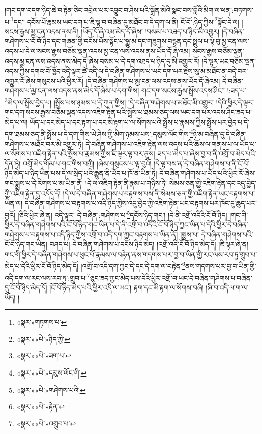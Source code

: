 །གང་དག་བདག་ཉིད་ཆེ་བ་རྟེན་ཅིང་འབྲེལ་པར་འབྱུང་བ་ཤེས་པའི་སྒྲོན་མེའི་སྣང་བས་བློའི་མིག་ལ་ཕན་:བཏགས་པ་\footnote{«སྣར་»གཏགས་པ་}དང་། དངོས་པོ་རྣམས་ཡང་དག་པ་ཇི་ལྟ་བ་བཞིན་དུ་མཐོང་བ་དེ་དག་ལ་ནི། ངོ་བོ་:ཉིད་ཀྱིས་\footnote{«སྣར་»«པེ་»ཉིད་ཀྱི་}སྟོང་དེ་ལ། །སངས་རྒྱས་མྱ་ངན་འདས་ནས་ནི། །ཡོད་དོ་ཞེ་འམ་མེད་དོ་ཞེས། །བསམ་པ་འཐད་པ་ཉིད་མི་འགྱུར། །དེ་བཞིན་གཤེགས་པ་ངོ་བོ་ཉིད་དང་གཞན་གྱི་དངོས་པོས་སྟོང་པ་སྒྱུ་མ་དང་གཟུགས་བརྙན་དང་སྤྲུལ་པ་ལྟ་བུ་མྱ་ངན་ལས་འདས་པ་དེ་ལ་སངས་རྒྱས་བཅོམ་ལྡན་འདས་མྱ་ངན་ལས་འདས་ནས་ཡོད་དོ་ཞེ་འམ། སངས་རྒྱས་བཅོམ་ལྡན་འདས་མྱ་ངན་ལས་འདས་ནས་མེད་དོ་ཞེས་བསམ་པ་དེ་དག་འཐད་པ་ཉིད་དུ་མི་འགྱུར་རོ། །དེ་ལྟར་ཡང་བཅོམ་ལྡན་འདས་ཀྱིས་དགའ་བོ་ཁྱོད་འདི་ལྟར་ཚེ་འདི་ལ་དེ་བཞིན་གཤེགས་པ་ཡང་དག་པར་རྗེས་སུ་མ་མཐོང་ན་བདེ་བར་འགྱུར་རོ་ཞེས་གསུངས་པའི་ཕྱིར་རོ། །དེ་བཞིན་གཤེགས་པ་མྱ་ངན་ལས་འདས་ནས་ཡོད་དོ་ཞེའམ། དེ་བཞིན་གཤེགས་པ་མྱ་ངན་ལས་འདས་ནས་མེད་དོ་ཞེས་པ་དག་གིས། གང་དག་སངས་རྒྱས་སྤྲོས་འདས་ཤིང་། །:ཟད་པ་\footnote{«སྣར་»«པེ་»ཟག་པ་}མེད་ལ་སྤྲོས་བྱེད་པ། །སྤྲོས་པས་ཉམས་པ་དེ་ཀུན་གྱིས། །དེ་བཞིན་གཤེགས་པ་མཐོང་མི་འགྱུར། །དེའི་ཕྱིར་དེ་ལྟར་གང་དག་སངས་རྒྱས་བཅོམ་ལྡན་འདས་འཇིག་རྟེན་པའི་སྤྲོས་པ་ཐམས་ཅད་ལས་ཡང་དག་པར་འདས་ཤིང་ཟད་པ་མེད་པ་ལ། ཡོད་པ་དང་མེད་པ་དང་རྟག་པ་དང་མི་རྟག་པ་ལ་སོགས་པའི་སྤྲོས་པ་རྣམས་ཀྱིས་སྤྲོས་པར་བྱེད་པ་དེ་དག་ཐམས་ཅད་ནི་སྤྲོས་པ་དེ་དག་གིས་ཡེ་ཤེས་ཀྱི་མིག་ཉམས་པས་:དམུས་ལོང་གིས་\footnote{«སྣར་»«པེ་»དམུས་ལོང་གི་}ཉི་མ་བཞིན་དུ་དེ་བཞིན་གཤེགས་པ་མཐོང་བར་མི་འགྱུར་ཏེ། དེ་བཞིན་གཤེགས་པ་འཇིག་རྟེན་ལས་འདས་པའི་ཆོས་ལ་གནས་པ་ལ་ཡོད་པ་ལ་སོགས་པ་འཇིག་རྟེན་པའི་སྤྲོས་པ་རྣམས་ཀྱིས་ཇི་ལྟར་ལྟ་བར་ནུས། ཟད་པ་མེད་པ་ཞེས་བྱ་བ་ནི་འགྲོ་བ་མེད་པའི་དོན་ཏེ། འགྲོ་མེད་གོམ་པ་གང་གིས་བཀྲི། །ཞེས་གསུངས་པ་ལྟ་བུའོ། །དེ་ལྟ་བས་ན་དེ་བཞིན་གཤེགས་པ་ནི་ངོ་བོ་ཉིད་མེད་པ་ཉིད་ཡིན་པས་དེ་ལ་སྲིད་པའི་རྒྱུན་ནི་ཡོད་པ་ཁོ་ན་ཡིན་ཏེ། དེ་བཞིན་གཤེགས་པ་ཡོད་པའི་ཕྱིར་རོ་ཞེས་གང་སྨྲས་པ་དེ་རིགས་པ་མ་ཡིན་ནོ། །དེ་ལ་འཇིག་རྟེན་ནི་རྣམ་པ་གཉིས་ཏེ། སེམས་ཅན་གྱི་འཇིག་རྟེན་དང་འདུ་བྱེད་ཀྱི་འཇིག་རྟེན་དུ་འདོད་དོ། །དེ་ལ་དེ་བཞིན་གཤེགས་པ་བརྟགས་པས་ནི་སེམས་ཅན་གྱི་འཇིག་རྟེན་ཡང་བརྟགས་པ་ཡིན་ལ། དེ་བཞིན་གཤེགས་པ་བརྟགས་པ་འདི་ཉིད་ཀྱིས་འདུ་བྱེད་ཀྱི་འཇིག་རྟེན་ཡང་བརྟགས་པར་ཁོང་དུ་ཆུད་པར་བྱའོ། །ཅིའི་ཕྱིར་ཞེ་ན། འདི་ལྟར། དེ་བཞིན་:གཤེགས་པ་\footnote{«སྣར་»«པེ་»གཤེགས་པའི་}དངོས་ཉིད་གང་། །དེ་ནི་འགྲོ་འདིའི་ངོ་བོ་ཉིད། །གང་གི་ཕྱིར་དེ་བཞིན་གཤེགས་པའི་ངོ་བོ་ཉིད་གང་ཡིན་པ་དེ་ནི་འགྲོ་བ་འདིའི་ངོ་བོ་ཉིད་ཀྱང་ཡིན་པ་དེའི་ཕྱིར་དེ་བཞིན་གཤེགས་པ་བརྟགས་པ་འདི་ཉིད་ཀྱིས་འགྲོ་བ་འདི་དག་ཀྱང་བརྟགས་པ་ཡིན་ནོ། །སྨྲས་པ། དེ་བཞིན་གཤེགས་པའི་ངོ་བོ་ཉིད་གང་ཡིན། བཤད་པ། དེ་བཞིན་གཤེགས་པ་དངོས་ཉིད་མེད། །འགྲོ་འདི་ངོ་བོ་ཉིད་མེད་དོ། །ཇི་ལྟར་ཞེ་ན། གང་གི་ཕྱིར་དེ་བཞིན་གཤེགས་པ་ཕུང་པོ་རྣམས་ལ་བརྟེན་ནས་གདགས་པར་བྱ་བ་ཡིན་གྱི་རང་ལས་རབ་ཏུ་གྲུབ་པ་མེད་པ་དེའི་ཕྱིར་ངོ་བོ་ཉིད་མེད་དོ། །འགྲོ་བ་འདི་དག་ཀྱང་དེ་དང་དེ་དག་ལ་བརྟེན་\footnote{«སྣར་»«པེ་»རྟེན་}ནས་གདགས་པར་བྱ་བ་ཡིན་གྱི་འདི་དག་ལ་རང་ལས་རབ་ཏུ་:གྲུབ་པ་\footnote{«སྣར་»«པེ་»འགྲུབ་པ་}ཅུང་ཟད་ཀྱང་མེད་པས་དེའི་ཕྱིར་འགྲོ་བ་ཡང་དེ་བཞིན་གཤེགས་པ་བཞིན་དུ་ངོ་བོ་ཉིད་མེད་དོ། །ངོ་བོ་ཉིད་མེད་པའི་ཕྱིར་འདི་ལ་ཡང་། རྟག་དང་མི་རྟག་ལ་སོགས་བཞི། །ཞི་བ་འདི་ལ་ག་ལ་ཡོད། །
